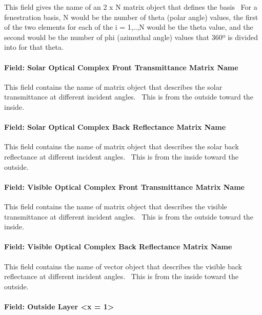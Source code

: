 This field gives the name of an 2 x N matrix object that defines the basis~ For a fenestration basis, N would be the number of theta (polar angle) values, the first of the two elements for each of the i = 1,..,N would be the theta value, and the second would be the number of phi (azimuthal angle) values that 360º is divided into for that theta.

\paragraph{Field: Solar Optical Complex Front Transmittance Matrix Name}\label{field-solar-optical-complex-front-transmittance-matrix-name}

This field contains the name of matrix object that describes the solar transmittance at different incident angles.~ This is from the outside toward the inside.

\paragraph{Field: Solar Optical Complex Back Reflectance Matrix Name}\label{field-solar-optical-complex-back-reflectance-matrix-name}

This field contains the name of matrix object that describes the solar back reflectance at different incident angles.~ This is from the inside toward the outside.

\paragraph{Field: Visible Optical Complex Front Transmittance Matrix Name}\label{field-visible-optical-complex-front-transmittance-matrix-name}

This field contains the name of matrix object that describes the visible transmittance at different incident angles.~ This is from the outside toward the inside.

\paragraph{Field: Visible Optical Complex Back Reflectance Matrix Name}\label{field-visible-optical-complex-back-reflectance-matrix-name}

This field contains the name of vector object that describes the visible back reflectance at different incident angles.~ This is from the inside toward the outside.

\paragraph{Field: Outside Layer \textless{}x = 1\textgreater{}}\label{field-outside-layer-x-1}

